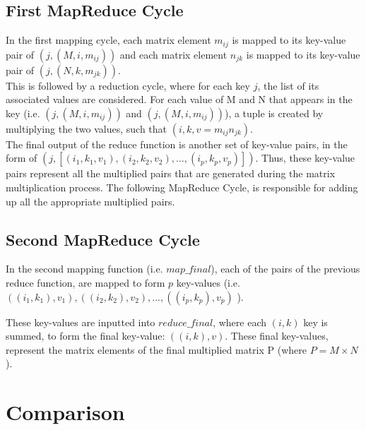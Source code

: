 \documentclass[journal, a4paper]{IEEEtran}
\begin{document}
\subsection{First MapReduce Cycle}
\noindent
In the first mapping cycle, each matrix element $m_{ij}$ is mapped to its key-value pair of $(j, (M, i, m_{ij}))$ and each matrix element $n_{jk}$ is mapped to its key-value pair of $(j, (N, k, m_{jk}))$. \\

This is followed by a reduction cycle, where for each key $j$, the list of its associated values are considered. For each value of M and N that appears in the key (i.e. $(j, (M, i, m_{ij}))$ and $(j, (M, i, m_{ij}))$), a tuple is created by multiplying the two values, such that $(i, k, v = m_{ij}n_{jk})$.\\

The final output of the reduce function is another set of key-value pairs, in the form of $(j, [ (i_1,k_1,v_1), (i_2,k_2, v_2), ..., (i_p,k_p, v_p) ])$. Thus, these key-value pairs represent all the multiplied pairs that are generated during the matrix multiplication process. The following MapReduce Cycle, is responsible for adding up all the appropriate multiplied pairs.

\subsection{Second MapReduce Cycle}
\noindent
In the second mapping function (i.e. $map\_final$), each of the pairs of the previous reduce function, are mapped to form $p$ key-values (i.e.$((i_1,k_1),v_1), ((i_2,k_2), v_2), ..., ((i_p,k_p), v_p)$ ).

These key-values are inputted into $reduce\_final$, where each $(i,k)$ key is summed, to form the final key-value: $((i,k), v)$. These final key-values, represent the matrix elements of the final multiplied matrix P (where $P=M\times N$).\\

\section{Comparison}
\end{document}
